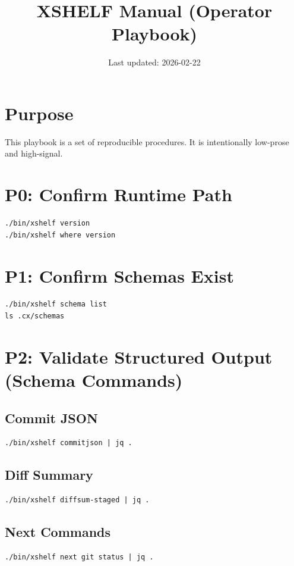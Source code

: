 \documentclass[11pt]{article}
\title{XSHELF Manual (Operator Playbook)}
\author{}
\date{Last updated: 2026-02-22}
\begin{document}
\maketitle
\vspace{-0.6em}

\section*{Purpose}
This playbook is a set of reproducible procedures. It is intentionally low-prose and high-signal.

\section{P0: Confirm Runtime Path}
\begin{lstlisting}[style=cx]
./bin/xshelf version
./bin/xshelf where version
\end{lstlisting}

\section{P1: Confirm Schemas Exist}
\begin{lstlisting}[style=cx]
./bin/xshelf schema list
ls .cx/schemas
\end{lstlisting}

\section{P2: Validate Structured Output (Schema Commands)}
\subsection*{Commit JSON}
\begin{lstlisting}[style=cx]
./bin/xshelf commitjson | jq .
\end{lstlisting}

\subsection*{Diff Summary}
\begin{lstlisting}[style=cx]
./bin/xshelf diffsum-staged | jq .
\end{lstlisting}

\subsection*{Next Commands}
\begin{lstlisting}[style=cx]
./bin/xshelf next git status | jq .
\end{lstlisting}
\end{document}
